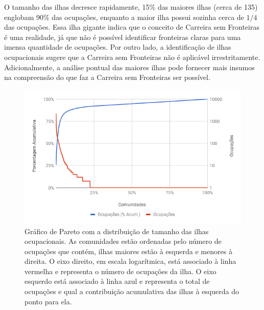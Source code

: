 \documentclass[
  article,
  11pt,
  a4paper,
  english,
  brazil,
  sumario=tradicional]{abntex2}
\begin{document}
O tamanho das ilhas decresce rapidamente, 15\% das maiores ilhas (cerca de 135) englobam 90\% das ocupações, enquanto a maior ilha possui sozinha cerca de $1/4$ das ocupações. Essa ilha gigante indica que o conceito de Carreira sem Fronteiras é uma realidade, já que não é possível identificar fronteiras claras para uma imensa quantidade de ocupações. Por outro lado, a identificação de ilhas ocupacionais sugere que a Carreira sem Fronteiras não é aplicável irrestritamente. Adicionalmente, a análise pontual das maiores ilhas pode fornecer mais insumos na compreensão do que faz a Carreira sem Fronteiras ser possível.

\begin{figure}[htb]
    \centering
    \includegraphics[width=0.9\linewidth]{pareto-comunidades.png}
    \caption{Gráfico de Pareto com a distribuição de tamanho das ilhas ocupacionais. As comunidades estão ordenadas pelo número de ocupações que contém, ilhas maiores estão à esquerda e menores à direita. O eixo direito, em escala logarítmica, está associado à linha vermelha e representa o número de ocupações da ilha. O eixo esquerdo está associado à linha azul e representa o total de ocupações e qual a contribuição acumulativa das ilhas à esquerda do ponto para ela.}
    \label{fig:pareto-comunidades}
\end{figure}
\end{document}
